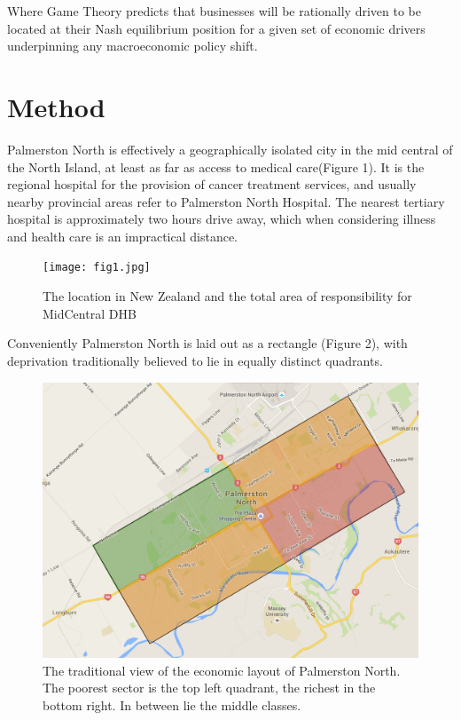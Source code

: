 \documentclass[11pt,a4paper]{article}
\begin{document}
Where Game Theory predicts that businesses will be rationally driven to be located at their Nash equilibrium position for a given set of economic drivers underpinning any macroeconomic policy shift. \\

\pagebreak
\section{Method}
Palmerston North is effectively a geographically isolated city in the mid central of the North Island, at least as far as access to medical care(Figure 1). It is the regional hospital for the provision of cancer treatment services, and usually nearby provincial areas refer to Palmerston North Hospital. The nearest tertiary hospital is approximately two hours drive away, which when considering illness and health care is an impractical distance.\\

\begin{figure}[htp]
\centering
\texttt{[image: fig1.jpg]}
\caption{The location in New Zealand and the total area of responsibility for MidCentral DHB}
\label{MidCentral District Health Board}
\end{figure}

Conveniently Palmerston North is laid out as a rectangle (Figure 2), with deprivation traditionally believed to lie in equally distinct quadrants.\\

\begin{figure}[htp]
\centering
\includegraphics[scale=0.20]{fig2.png}
\caption{The traditional view of the economic layout of Palmerston North. The poorest sector is the top left quadrant, the richest in the bottom right. In between lie the middle classes.}
\label{Traditional view of the spatial economics of Palmerston North City}
\end{figure}
\end{document}
